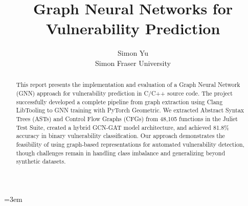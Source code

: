 

\emergencystretch=3em

\hypersetup{breaklinks=true}


\sloppy
{}

\date{}

\title{\Large \bf Graph Neural Networks for Vulnerability Prediction}

\author{
{\rm Simon Yu}\\
Simon Fraser University
} %

\maketitle

\begin{abstract}
This report presents the implementation and evaluation of a Graph Neural Network (GNN) approach for vulnerability prediction in C/C++ source code. The project successfully developed a complete pipeline from graph extraction using Clang LibTooling to GNN training with PyTorch Geometric. We extracted Abstract Syntax Trees (ASTs) and Control Flow Graphs (CFGs) from 48,105 functions in the Juliet Test Suite, created a hybrid GCN-GAT model architecture, and achieved 81.8\% accuracy in binary vulnerability classification. Our approach demonstrates the feasibility of using graph-based representations for automated vulnerability detection, though challenges remain in handling class imbalance and generalizing beyond synthetic datasets.
\end{abstract}


